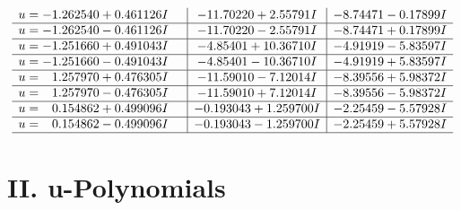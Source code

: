 \documentclass[1p]{elsarticle_modified}
\theoremstyle{definition}
\begin{document}
$$\begin{array}{c|c|c}
\begin{aligned}
u &= -1.262540 + 0.461126 I\end{aligned}
 & -11.70220 + 2.55791 I & -8.74471 - 0.17899 I \\ \hline\begin{aligned}
u &= -1.262540 - 0.461126 I\end{aligned}
 & -11.70220 - 2.55791 I & -8.74471 + 0.17899 I \\ \hline\begin{aligned}
u &= -1.251660 + 0.491043 I\end{aligned}
 & -4.85401 + 10.36710 I & -4.91919 - 5.83597 I \\ \hline\begin{aligned}
u &= -1.251660 - 0.491043 I\end{aligned}
 & -4.85401 - 10.36710 I & -4.91919 + 5.83597 I \\ \hline\begin{aligned}
u &= \phantom{-}1.257970 + 0.476305 I\end{aligned}
 & -11.59010 - 7.12014 I & -8.39556 + 5.98372 I \\ \hline\begin{aligned}
u &= \phantom{-}1.257970 - 0.476305 I\end{aligned}
 & -11.59010 + 7.12014 I & -8.39556 - 5.98372 I \\ \hline\begin{aligned}
u &= \phantom{-}0.154862 + 0.499096 I\end{aligned}
 & -0.193043 + 1.259700 I & -2.25459 - 5.57928 I \\ \hline\begin{aligned}
u &= \phantom{-}0.154862 - 0.499096 I\end{aligned}
 & -0.193043 - 1.259700 I & -2.25459 + 5.57928 I\\
 \hline 
 \end{array}$$\newpage
\newpage\renewcommand{\arraystretch}{1}
\centering \section*{ II. u-Polynomials}
\end{document}
